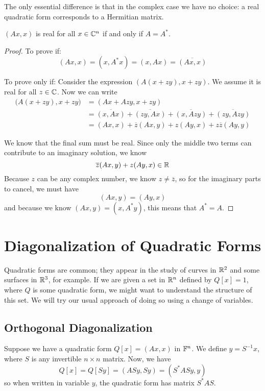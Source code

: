 The only essential difference is that in the complex case we have no choice: a real quadratic form corresponds to a Hermitian matrix. 

\begin{theorem}
$(Ax, x)$ is real for all $x \in \mathbb{C}^{n}$ if and only if $A = A^{*}$.  
\end{theorem}

\begin{proof}
To prove if: 
$$(Ax, x) = (x, A^{*} x) = (x, Ax) = \overline{(Ax, x)}$$

To prove only if: Consider the expression $(A (x + zy), x + zy)$. We assume it is real for all $z \in \mathbb{C}$. Now we can write 
$$
\begin{aligned}
\Big( A (x + zy), x + zy \Big) &= ( Ax + Azy, x + zy) \\
&= \overline{(x, Ax)} + \overline{(zy, Ax)} + \overline{(x, Azy)} + \overline{(zy, Azy)} \\ 
&= (Ax, x) + \overline{z} (Ax, y) + z (Ay, x) + z \overline{z} (Ay, y)
\end{aligned}
$$

We know that the final sum must be real. Since only the middle two terms can contribute to an imaginary solution, we know 
$$\overline{z} (Ax, y) + z (Ay, x) \in \mathbb{R}$$
Because $z$ can be any complex number, we know $z \neq \overline{z}$, so for the imaginary parts to cancel, we must have
$$(Ax, y) = (Ay, x)$$
and because we know $(Ax, y) = (x, A^{*} y)$, this means that $A^{*} = A$. 
\end{proof}

\section{Diagonalization of Quadratic Forms}

Quadratic forms are common; they appear in the study of curves in $\mathbb{R}^{2}$ and some surfaces in $\mathbb{R}^{3}$, for example. If we are given a set in $\mathbb{R}^{n}$ defined by $Q[x] = 1$, where $Q$ is some quadratic form, we might want to understand the structure of this set. We will try our usual approach of doing so using a change of variables. 

\subsection{Orthogonal Diagonalization}

Suppose we have a quadratic form $Q[x] = (Ax, x)$ in $\mathbb{F}^{n}$. We define $y = S^{-1} x$, where $S$ is any invertible $n \times n$ matrix. Now, we have
$$Q[x] = Q[Sy] = (ASy, Sy) = (S^{*} AS y, y)$$
so when written in variable $y$, the quadratic form has matrix $S^{*}AS$. 

